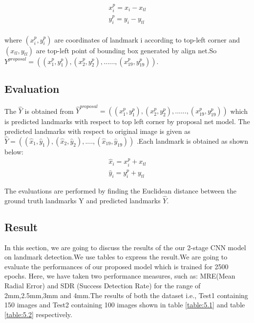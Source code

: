 \documentclass[sn-mathphys]{sn-jnl}%
\theoremstyle{thmstyleone}%
\theoremstyle{thmstyletwo}%
\theoremstyle{thmstylethree}%
\begin{document}
\begin{align*}
    x^{p}_{i} = x_{i} - x_{tl}\\
    y^{p}_{i} = y_{i} - y_{tl}\\
\end{align*}
   

 where \begin{math}(x^{p}_{i},y^{p}_{i}) \end{math} are coordinates of landmark i according to top-left corner and \begin{math}
 (x_{tl},y_{tl}) \end{math} are top-left point of bounding box generated by align net.So \begin{math}
 Y^{proposal} = ((x^{p}_{1},y^{p}_{1}) , (x^{p}_{2},y^{p}_{2}),...... ,(x^{p}_{19},y^{p}_{19})).
 \end{math}


\subsection{Evaluation}
The \begin{math} \hat{Y} \end{math} is obtained from \begin{math} \hat{Y}^{proposal}= ((x^{p}_{1},y^{p}_{1}) , (x^{p}_{2},y^{p}_{2}),...... ,(x^{p}_{19},y^{p}_{19})) \end{math} which is predicted landmarks with respect to top left corner by proposal net model. The predicted landmarks with respect to original image is given as \begin{math}
\hat{Y} = ((\hat{x}_{1},\hat{y}_{1}),(\hat{x}_{2},\hat{y}_{2}),....,(\hat{x}_{19},\hat{y}_{19}))\end{math} .Each landmark is obtained as shown below:
\\
\begin{align*}
    \hat{x}_{i} = x^{p}_{i} + x_{tl}\\
    \hat{y}_{i} = y^{p}_{i} + y_{tl}
\end{align*}

 The evaluations are performed by finding the Euclidean distance between the ground truth landmarks Y and predicted landmarks \begin{math} \hat{Y} \end{math}.
 
 \subsection{Result}
 In this section, we are going to discuss the results of the our 2-stage CNN model on landmark detection.We use tables to
express the result.We are going to evaluate the performances of our proposed model which is trained for 2500 epochs. Here, we have taken two performance measures, such as: MRE(Mean Radial Error) and SDR (Success Detection Rate) for the range of 2mm,2.5mm,3mm and 4mm.The results of both the dataset i.e., Test1 containing 150 images and Test2 containing 100 images shown in table \ref{table:5.1} and table \ref{table:5.2} respectively.
 
\end{document}

